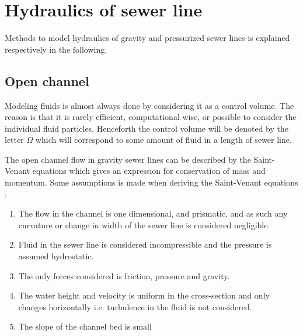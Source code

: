 ﻿\section{Hydraulics of sewer line}\label{se:hydraulics_of_sewer_line}
Methods to model hydraulics of gravity and pressurized sewer lines is explained respectively in the following. 

\subsection{Open channel}\label{subse:open_channel}
Modeling fluids is almost always done by considering it as a control volume. The reason is that it is rarely efficient, computational wise, or possible to consider the individual fluid particles.
Henceforth the control volume will be denoted by the letter $\Omega$ which will correspond to some amount of fluid in a length of sewer line.		

The open channel flow in gravity sewer lines can be described by the Saint-Venant equations which gives an expression for conservation of mass and momentum.
Some assumptions is made when deriving the Saint-Venant equations \cite{schutze2011modelling}:

\begin{table}[H]
\begin{enumerate}
\item The flow in the channel is one dimensional, and prismatic, and as such any curvature or change in width of the sewer line is considered negligible.
\item Fluid in the sewer line is considered incompressible and the pressure is assumed hydrostatic.
\item The only forces considered is friction, pressure and gravity.
\item The water height and velocity is uniform in the cross-section and only changes horizontally i.e. turbulence in the fluid is not considered.
\item The slope of the channel bed is small
\end{enumerate}
\label{tab:saintbernard_assumptions}
\end{table}

